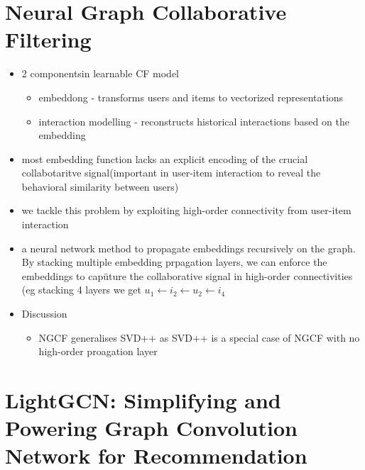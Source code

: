 \documentclass{report}
\begin{document}
\section{Neural Graph Collaborative Filtering}
\begin{itemize}
    \item 2 componentsin learnable CF model
    \begin{itemize}
        \item embeddong - transforms users and items to vectorized representations
        \item interaction modelling - reconstructs historical interactions based on the embedding
    \end{itemize}
    \item most embedding function lacks an explicit encoding of the crucial collabotaritve signal(important in user-item interaction to reveal the behavioral similarity between users)
    \item we tackle this problem by exploiting high-order connectivity from user-item interaction
    \item a neural network method to propagate embeddings recursively on the graph. By stacking multiple embedding prpagation layers, we can enforce the embeddings to capüture the collaborative signal in high-order connectivities (eg stacking 4 layers we get \(u_1 \leftarrow i_2 \leftarrow u_2 \leftarrow i_4 \)
    \item Discussion
    \begin{itemize}
        \item NGCF generalises SVD++ as SVD++ is a special case of NGCF with no high-order proagation layer
    \end{itemize}
\end{itemize}
\section{LightGCN: Simplifying and Powering Graph Convolution Network for Recommendation}
\end{document}
